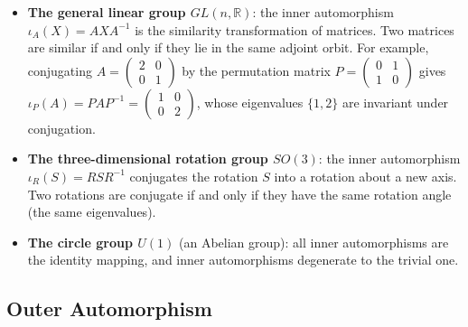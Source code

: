 \begin{example}\label{ex:rotation_operation_examples}
\begin{itemize}
    \item \textbf{The general linear group $GL(n,\mathbb{R})$}: the inner automorphism $\iota_A(X) = AXA^{-1}$ is the similarity transformation of matrices. Two matrices are similar if and only if they lie in the same adjoint orbit. For example, conjugating $A=\begin{pmatrix}2&0\\0&1\end{pmatrix}$ by the permutation matrix $P=\begin{pmatrix}0&1\\1&0\end{pmatrix}$ gives $\iota_P(A)=PAP^{-1}=\begin{pmatrix}1&0\\0&2\end{pmatrix}$, whose eigenvalues $\{1,2\}$ are invariant under conjugation.
    \item \textbf{The three-dimensional rotation group $SO(3)$}: the inner automorphism $\iota_R(S) = RSR^{-1}$ conjugates the rotation $S$ into a rotation about a new axis. Two rotations are conjugate if and only if they have the same rotation angle (the same eigenvalues).
    \item \textbf{The circle group $U(1)$} (an Abelian group): all inner automorphisms are the identity mapping, and inner automorphisms degenerate to the trivial one.
\end{itemize}
\end{example}

\subsection{\texorpdfstring{Outer Automorphism}{Outer Automorphism}}
\label{subsec:outer_automorphism}

